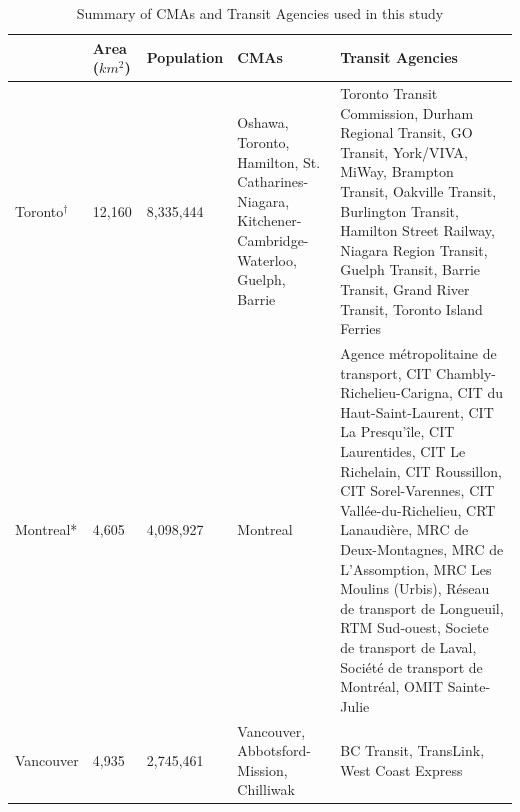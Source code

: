 \documentclass[11 pt, letterpaper]{article}
\begin{document}
{%
\begin{table}
	\vspace{4mm}
	\begin{adjustwidth}{-.25in}{-.25in} 
		\begin{singlespace}
		\renewcommand{\arraystretch}{1.2} %
		\small
		\caption{Summary of CMAs and Transit Agencies used in this study}
		\label{table_cma_agencies}
		\begin{tabular}{L{19mm}L{10mm}L{17mm}L{33mm}L{60mm}}
			           & Area ($km^{2}$) & Population & CMAs                                                                                                  & Transit Agencies                                                                                                                                                                                                                                                                                                                                                                                                                          \\
			\hline
			Toronto$^\dagger$    & 12,160 & 8,335,444& Oshawa, Toronto, Hamilton, St. Catharines-Niagara, Kitchener-Cambridge-Waterloo, Guelph, Barrie & Toronto Transit Commission, Durham Regional Transit, GO Transit, York/VIVA, MiWay, Brampton Transit, Oakville Transit, Burlington Transit, Hamilton Street Railway, Niagara Region Transit, Guelph Transit, Barrie Transit, Grand River Transit, Toronto Island Ferries                                                                                                           \\ \hline
			Montreal*   & 4,605  & 4,098,927    & Montreal                                                                                & Agence métropolitaine de transport, CIT Chambly-Richelieu-Carigna, CIT du Haut-Saint-Laurent, CIT La Presqu'île, CIT Laurentides, CIT Le Richelain, CIT Roussillon, CIT Sorel-Varennes, CIT Vallée-du-Richelieu, CRT Lanaudière, MRC de Deux-Montagnes, MRC de L'Assomption, MRC Les Moulins (Urbis), Réseau de transport de Longueuil, RTM Sud-ouest, Societe de transport de Laval, Société de transport de Montréal, OMIT Sainte-Julie \\ \hline
			Vancouver   & 4,935  & 2,745,461    & Vancouver, Abbotsford-Mission, Chilliwak                                                              & BC Transit, TransLink, West Coast Express                                                                                                                                                                                                                                                                                                                                                                                                 \\ \hline

\end{tabular}
\end{singlespace}
\end{adjustwidth}
\end{table}}
\end{document}
